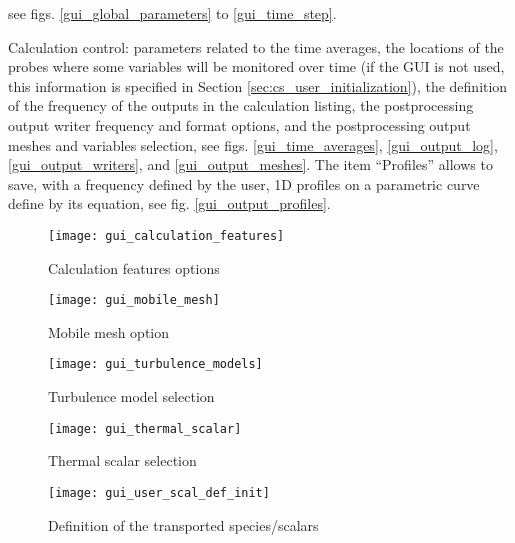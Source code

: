 {{\begin{list}{-}{}
see figs. \ref{gui_global_parameters} to \ref{gui_time_step}.
\item Calculation control: parameters related to the time averages, the
      locations of the probes where some variables will be monitored over time
      (if the GUI is not used, this information is specified in Section
      \ref{sec:cs_user_initialization}), the definition of the frequency of the outputs in the calculation
      listing, the postprocessing output writer frequency and format options, and
      the postprocessing output meshes and variables selection, see
      figs. \ref{gui_time_averages}, \ref{gui_output_log}, \ref{gui_output_writers},
      and \ref{gui_output_meshes}. The item ``Profiles'' allows to save, with a
      frequency defined by the user, 1D profiles on a parametric curve define by its equation, see fig. \ref{gui_output_profiles}.
\end{list}

\begin{figure}[!ht]
\begin{center}
\texttt{[image: gui\_calculation\_features]}
\caption{Calculation features options}
\label{gui_calculation_features}
\end{center}
\end{figure}

\begin{figure}[!ht]
\begin{center}
\texttt{[image: gui\_mobile\_mesh]}
\caption{Mobile mesh option}
\label{gui_mobile_mesh}
\end{center}
\end{figure}

\begin{figure}[!ht]
\begin{center}
\texttt{[image: gui\_turbulence\_models]}
\caption{Turbulence model selection}
\label{gui_turbulence_models}
\end{center}
\end{figure}

\begin{figure}[!ht]
\begin{center}
\texttt{[image: gui\_thermal\_scalar]}
\caption{Thermal scalar selection}
\label{gui_thermal_scalar}
\end{center}
\end{figure}

\begin{figure}[!ht]
\begin{center}
\texttt{[image: gui\_user\_scal\_def\_init]}
\caption{Definition of the transported species/scalars}
\label{gui_species}
\end{center}
\end{figure}

}}
